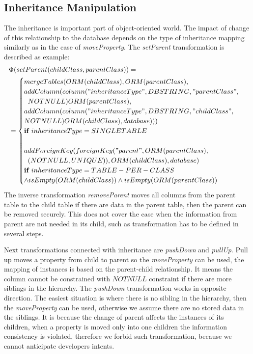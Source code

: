 \documentclass[runningheads]{comsis}
\begin{document}
\subsection{Inheritance Manipulation}
\label{sec:inheritance}
The inheritance is important part of object-oriented world. The impact of change of this relationship to the database depends on the type of inheritance mapping similarly as in the case of \emph{moveProperty}. The \emph{setParent} transformation is described as example:
\begin{align}
&\Phi(setParent(childClass, parentClass)) = \nonumber \\
&= \begin{cases}
mergeTables(ORM(childClass), ORM(parentClass),\\
addColumn(column("inheritanceType", DBSTRING, "parentClass", \\ \; \; NOTNULL) ORM(parentClass), \\
     addColumn(column("inheritanceType", DBSTRING, "childClass", \\ NOTNULL) ORM(childClass), database))) \\
     \mathbf{if} \; inheritanceType = SINGLETABLE 
     \\\\
     addForeignKey(foreignKey("parent", ORM(parentClass), \\
     \; \; (NOTNULL, UNIQUE)), ORM(childClass), database) \\
     \mathbf{if} \; inheritanceType = TABLE-PER-CLASS \\ \wedge  
     isEmpty(ORM(childClass)) \wedge isEmpty(ORM(parentClass))
 \end{cases}
\end{align}
The inverse transformation \emph{removeParent} moves all columns from the parent table to the child table if there are data in the parent table, then the parent can be removed securely. This does not cover the case when the information from parent are not needed in its child, such as transformation has to be defined in several steps. 

Next transformations connected with inheritance are \emph{pushDown} and \emph{pullUp}. Pull up moves a property from child to parent so the \emph{moveProperty} can be used, the mapping of instances is based on the parent-child relationship. It means the column cannot be constrained with $NOTNULL$ constraint if there are more siblings in the hierarchy. The \emph{pushDown} transformation works in opposite direction. The easiest situation is where there is no sibling in the hierarchy, then the \emph{moveProperty} can be used, otherwise we assume there are no stored data in the siblings. It is because the change of parent affects the instances of its children, when a property is moved only into one children the information consistency is violated, therefore we forbid such transformation, because we cannot anticipate developers intents.
\end{document}
